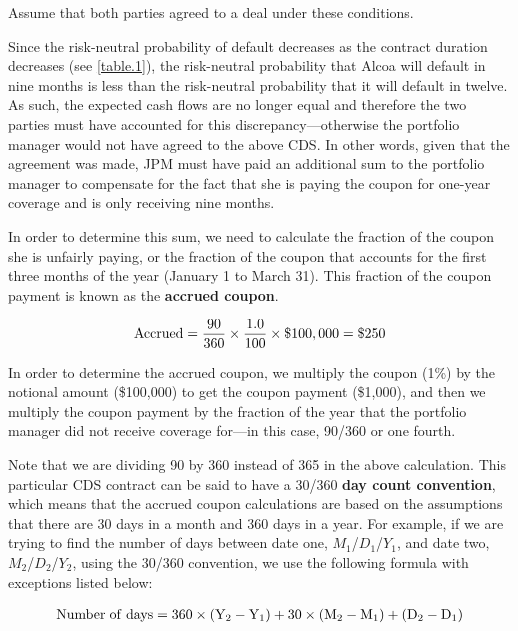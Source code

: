 \documentclass{jss}
\begin{document}
Assume that both parties agreed to a deal under these conditions. 

Since the risk-neutral probability of default decreases as the contract duration decreases (see \ref{table.1}), the risk-neutral probability that Alcoa will default in nine months is less than the risk-neutral probability that it will default in twelve. As such, the expected cash flows are no longer equal and therefore the two parties must have accounted for this discrepancy---otherwise the portfolio manager would not have agreed to the above CDS. In other words, given that the agreement was made, JPM must have paid an additional sum to the portfolio manager to compensate for the fact that she is paying the coupon for one-year coverage and is only receiving nine months.

In order to determine this sum, we need to calculate the fraction of the coupon she is unfairly paying, or the fraction of the coupon that accounts for the first three months of the year (January 1 to March 31). This fraction of the coupon payment is known as the \textbf{accrued coupon}.

\begin{equation}
 \begin{aligned}
  {\rm Accrued = \frac{90}{360}\times\frac{1.0}{100}\times\$100,000 = \$250}
    \end{aligned}
\end{equation}

In order to determine the accrued coupon, we multiply the coupon (1\%) by the notional amount (\$100,000) to get the coupon payment (\$1,000), and then we multiply the coupon payment by the fraction of the year that the portfolio manager did not receive coverage for---in this case, 90/360 or one fourth. 

Note that we are dividing 90 by 360 instead of 365 in the above calculation. This particular CDS contract can be said to have a 30/360 \textbf{day count convention}, which means that the accrued coupon calculations are based on the assumptions that there are 30 days in a month and 360 days in a year. For example, if we are trying to find the number of days between date one, $M_1$/$D_1$/$Y_1$, and date two, $M_2$/$D_2$/$Y_2$, using the 30/360 convention, we use the following formula with exceptions listed below:

\begin{equation}
 \begin{aligned}
  {\rm Number\hspace{3pt}of\hspace{3pt}days = 360 \times (Y_{2} - Y_{1}) + 30 \times (M_{2} - M_{1}) + (D_{2} - D_{1})}
    \end{aligned}
\end{equation}
\end{document}

